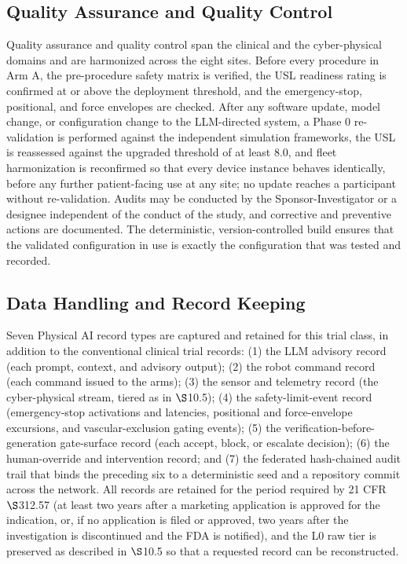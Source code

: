 \subsection{Quality Assurance and Quality Control}

Quality assurance and quality control span the clinical and the cyber-physical
domains and are harmonized across the eight sites. Before every procedure in Arm A,
the pre-procedure safety matrix is verified, the USL readiness rating is confirmed at
or above the deployment threshold, and the emergency-stop, positional, and force
envelopes are checked. After any software update, model change, or configuration
change to the LLM-directed system, a Phase 0 re-validation is performed against the
independent simulation frameworks, the USL is reassessed against the upgraded
threshold of at least 8.0, and fleet harmonization is reconfirmed so that every
device instance behaves identically, before any further patient-facing use at any
site; no update reaches a participant without re-validation. Audits may be conducted
by the Sponsor-Investigator or a designee independent of the conduct of the study,
and corrective and preventive actions are documented. The deterministic,
version-controlled build ensures that the validated configuration in use is exactly
the configuration that was tested and recorded.

\subsection{\hspace{0.03cm} Data Handling and Record Keeping}

Seven Physical AI record types are captured and retained for this trial class, in
addition to the conventional clinical trial records: (1) the LLM advisory record
(each prompt, context, and advisory output); (2) the robot command record (each
command issued to the arms); (3) the sensor and telemetry record (the
cyber-physical stream, tiered as in $\S$10.5); (4) the safety-limit-event record
(emergency-stop activations and latencies, positional and force-envelope
excursions, and vascular-exclusion gating events); (5) the
verification-before-generation gate-surface record (each accept, block, or escalate
decision); (6) the human-override and intervention record; and (7) the federated
hash-chained audit trail that binds the preceding six to a deterministic seed and a
repository commit across the network. All records are retained for the period
required by 21 CFR $\S$312.57 (at least two years after a marketing application is
approved for the indication, or, if no application is filed or approved, two years
after the investigation is discontinued and the FDA is notified), and the L0 raw
tier is preserved as described in $\S$10.5 so that a requested record can be
reconstructed.

